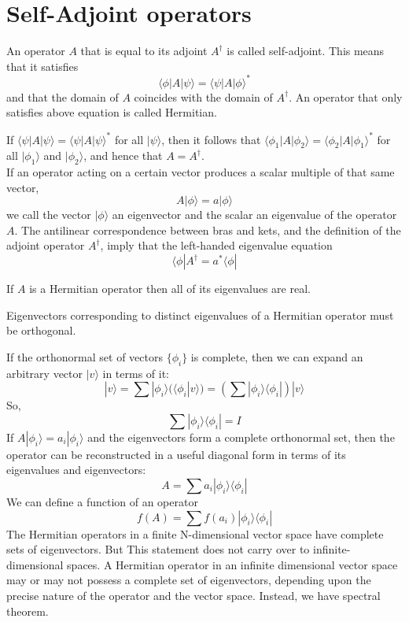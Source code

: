 \section{Self-Adjoint operators}
\begin{newdef}
An operator $A$ that is equal to its adjoint $A^{\dagger}$ is called self-adjoint. This means that it satisfies
\[\langle \phi | A | \psi \rangle  = \langle \psi | A | \phi \rangle^*\]
and that the domain of $A$ coincides with the domain of $A^{\dagger}$. An operator that only satisfies above equation is called Hermitian.
\end{newdef}

\begin{newthem}
If $\langle \psi | A | \psi \rangle  = \langle \psi | A | \psi \rangle^*$ for all $| \psi \rangle$, then it follows that $\langle \phi_1 | A | \phi_2 \rangle  = \langle \phi_2 | A | \phi_1 \rangle^*$ for all $|\phi_1\rangle$ and $|\phi_2\rangle$, and hence that $A = A^{\dagger}$.\\
If an operator acting on a certain vector produces a scalar multiple of that same vector,
\[ A |\phi \rangle = a |\phi \rangle\]
we call the vector $| \phi \rangle$ an eigenvector and the scalar an eigenvalue of the operator $A$. The antilinear correspondence between bras and kets, and the definition of the adjoint operator $A^{\dagger}$, imply that the left-handed eigenvalue equation
\[\langle \phi | A^{\dagger} = a^{*} \langle \phi |\]
\end{newthem}

\begin{newthem}
 If $A$ is a Hermitian operator then all of its eigenvalues are real.
\end{newthem}

\begin{newthem}
Eigenvectors corresponding to distinct eigenvalues of a Hermitian operator must be orthogonal.
\end{newthem}

\noindent
If the orthonormal set of vectors $\{ \phi_i \}$ is complete, then we can expand an arbitrary vector $|v\rangle$ in terms of it:
\[ |v\rangle = \sum | \phi_i \rangle (\langle \phi_i | v \rangle) = \left( \sum |\phi_i \rangle \langle \phi_i | \right) | v\rangle\]
So,
\[ \sum |\phi_i \rangle \langle \phi_i | = I\]
If $A |\phi_i \rangle = a_i |\phi_i\rangle$ and the eigenvectors form a complete orthonormal set, then the operator can be reconstructed in a useful diagonal form in terms of its eigenvalues and eigenvectors:
\[A = \sum a_i |\phi_i \rangle \langle \phi_i |\]
We can define a function of an operator
\[f(A) =  \sum f(a_i) |\phi_i \rangle \langle \phi_i |\]
The Hermitian operators in a finite N-dimensional vector space have complete sets of eigenvectors. But This statement does not carry over to infinite-dimensional spaces. A Hermitian operator in an infinite dimensional vector space may or may not possess a complete set of eigenvectors, depending upon the precise nature of the operator and the vector space. Instead, we have spectral theorem.

